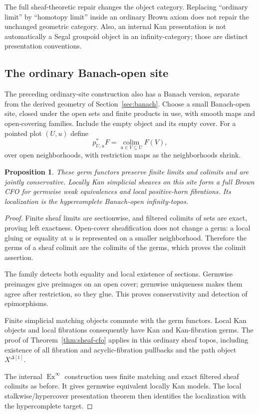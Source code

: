 \documentclass[12pt]{amsart}
\newtheorem{prop}[thm]{Proposition}
\theoremstyle{definition}
\theoremstyle{remark}
\numberwithin{equation}{section}
\DeclareMathOperator{\Ex}{Ex}
\begin{document}
The full sheaf-theoretic repair changes the object
category. Replacing ``ordinary limit'' by ``homotopy
limit'' inside an ordinary Brown axiom does not repair
the unchanged geometric category. Also, an internal
Kan presentation is not automatically a Segal groupoid
object in an infinity-category; those are distinct
presentation conventions.

\subsection{The ordinary Banach-open site}
\label{subsec:ordinary-banach}

The preceding ordinary-site construction also has
a Banach version, separate from the derived
geometry of Section~\ref{sec:banach}.
Choose a small Banach-open site, closed under the
open sets and finite products in use, with smooth
maps and open-covering families. Include the empty
object and its empty cover. For a pointed plot
$(U,u)$ define
\[
 p_{U,u}^*F=
 \operatorname*{colim}_{u\in V\subseteq U}F(V),
\]
over open neighborhoods, with restriction maps
as the neighborhoods shrink.

\begin{prop}\label{prop:ordinary-banach-site}
These germ functors preserve finite limits and
colimits and are jointly conservative. Locally
Kan simplicial sheaves on this site form a full
Brown CFO for germwise weak equivalences and
local positive-horn fibrations. Its localization
is the hypercomplete Banach-open infinity-topos.
\end{prop}

\begin{proof}
Finite sheaf limits are sectionwise, and filtered
colimits of sets are exact, proving left exactness.
Open-cover sheafification does not change a germ:
a local gluing or equality at $u$ is represented
on a smaller neighborhood. Therefore the germs
of a sheaf colimit are the colimits of the germs,
which proves the colimit assertion.

The family detects both equality and local
existence of sections. Germwise preimages give
preimages on an open cover; germwise uniqueness
makes them agree after restriction, so they glue.
This proves conservativity and detection of
epimorphisms.

Finite simplicial matching objects commute with
the germ functors. Local Kan objects and local
fibrations consequently have Kan and
Kan-fibration germs. The proof of
Theorem~\ref{thm:sheaf-cfo} applies in this
ordinary sheaf topos, including existence of
all fibration and acyclic-fibration pullbacks
and the path object $X^{\Delta[1]}$.

The internal $\Ex^\infty$ construction uses
finite matching and exact filtered sheaf
colimits as before. It gives germwise
equivalent locally Kan models. The local
stalkwise/hypercover presentation theorem
\cite{DHI2004,NSS2015} then identifies the
localization with the hypercomplete target.
\end{proof}
\end{document}
